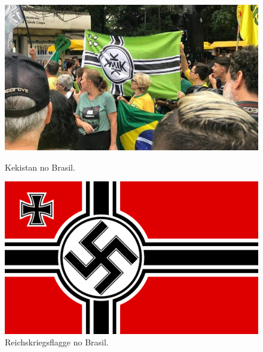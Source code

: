 \documentclass[portuguese]{textolivre}
\begin{document}
\begin{figure}[h!]
 \centering
 \begin{minipage}{.45\textwidth}
 \includegraphics[width=\textwidth]{image1.jpg}
 \caption{Kekistan no Brasil.}
 \label{fig1}
 \end{minipage}%
 \qquad
 \begin{minipage}{0.45\textwidth}
 \includegraphics[width=\textwidth]{image2.png}
 \caption{Reichskriegsflagge no Brasil.}
 \label{fig2}
 \end{minipage}%
\end{figure}
\end{document}
